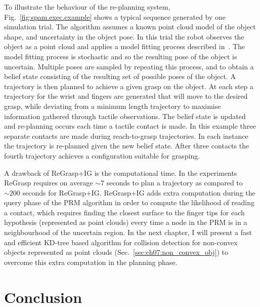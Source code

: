To illustrate the behaviour of the re-planning system, Fig.~\ref{fig:spam.exec.example} shows a typical sequence generated by one simulation trial. The algorithm assumes a known point cloud model of the object shape, and uncertainty in the object pose. In this trial the robot observes the object as a point cloud and applies a model fitting process described in~\citep{bib:uli_cviu_2011}. The model fitting process is stochastic and so the resulting pose of the object is uncertain. Multiple poses are sampled by repeating this process, and to obtain a belief state consisting of the resulting set of possible poses of the object. A trajectory is then planned to achieve a given grasp on the object. At each step a trajectory for the wrist and fingers are generated that will move to the desired grasp, while deviating from a minimum length trajectory to maximise information gathered through tactile observations. The belief state is updated and re-planning occurs each time a tactile contact is made. In this example three separate contacts are made during reach-to-grasp trajectories. In each instance the trajectory is re-planned given the new belief state. After three contacts the fourth trajectory achieves a configuration suitable for grasping.

A drawback of ReGrasp+IG is the computational time. In the experiments ReGrasp requires on average $\sim7$ seconds to plan a trajectory as compared to $\sim200$ seconds for ReGrasp+IG. ReGrasp+IG adds extra computation during the query phase of the PRM algorithm in order to compute the likelihood of reading a contact, which requires finding the closest surface to the finger tips for each hypothesis (represented as point clouds) every time a node in the PRM is in a neighbourhood of the uncertain region. In the next chapter, I will present a fast and efficient KD-tree based algorithm for collision detection for non-convex objects represented as point clouds (Sec.~\ref{sec:ch07:non_convex_obj}) to overcome this extra computation in the planning phase.


\section{Conclusion} 
\label{sec:ch06:summary}

